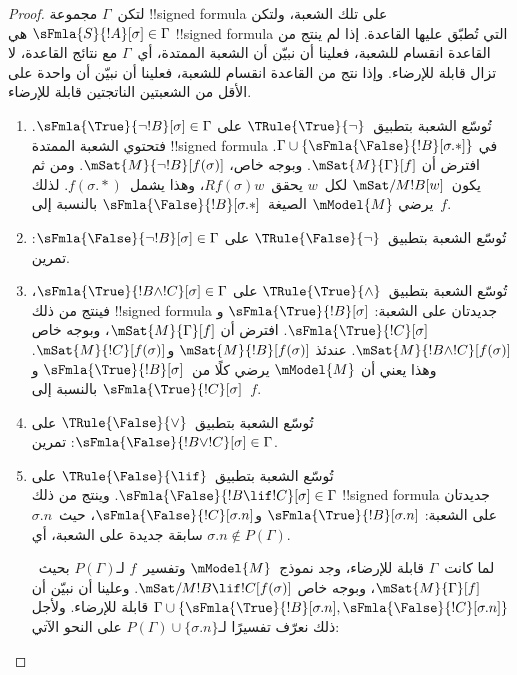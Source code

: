 \documentclass[../../../include/open-logic-section]{subfiles}
\begin{document}
\begin{proof}
لتكن~$\Gamma$ مجموعة !!{signed formula} على تلك الشعبة، ولتكن
$\sFmla{S}{!A}[\sigma] \in \Gamma$ هي !!{signed formula} التي تُطبّق
عليها القاعدة. إذا لم ينتج من القاعدة انقسام للشعبة، فعلينا أن نبيّن أن
الشعبة الممتدة، أي~$\Gamma$ مع نتائج القاعدة، لا تزال قابلة للإرضاء.
وإذا نتج من القاعدة انقسام للشعبة، فعلينا أن نبيّن أن واحدة على الأقل
من الشعبتين الناتجتين قابلة للإرضاء.
\begin{enumerate}
\item تُوسّع الشعبة بتطبيق~$\TRule{\True}{\lnot}$ على
  $\sFmla{\True}{\lnot !B}[\sigma] \in \Gamma$. فتحتوي الشعبة الممتدة
  !!{signed formula} في
  $\Gamma \cup \{\sFmla{\False}{!B}[\sigma.{*}]\}$. افترض أن
  $\mSat{M}{\Gamma}[f]$. وبوجه خاص،
  $\mSat{M}{\lnot !B}[f(\sigma)]$. ومن ثم يكون~$\mSat/{M}{!B}[w]$
  لكل~$w$ يحقق~$Rf(\sigma)w$، وهذا يشمل~$f(\sigma.{*})$. لذلك يرضي
  $\mModel{M}$ الصيغة~$\sFmla{\False}{!B}[\sigma.{*}]$ بالنسبة إلى~$f$.
\item تُوسّع الشعبة بتطبيق~$\TRule{\False}{\lnot}$ على
  $\sFmla{\False}{\lnot !B}[\sigma] \in \Gamma$: تمرين.
\item تُوسّع الشعبة بتطبيق~$\TRule{\True}{\land}$ على
  $\sFmla{\True}{!B \land !C}[\sigma] \in \Gamma$، فينتج من ذلك
  !!{signed formula} جديدتان على الشعبة:
  $\sFmla{\True}{!B}[\sigma]$ و$\sFmla{\True}{!C}[\sigma]$. افترض أن
  $\mSat{M}{\Gamma}[f]$، وبوجه خاص
  $\mSat{M}{!B \land !C}[f(\sigma)]$. عندئذ
  $\mSat{M}{!B}[f(\sigma)]$ و$\mSat{M}{!C}[f(\sigma)]$. وهذا يعني أن
  $\mModel{M}$ يرضي كلًا من~$\sFmla{\True}{!B}[\sigma]$
  و$\sFmla{\True}{!C}[\sigma]$ بالنسبة إلى~$f$.
\item تُوسّع الشعبة بتطبيق~$\TRule{\False}{\lor}$ على
  $\sFmla{\False}{!B \lor !C}[\sigma] \in \Gamma$: تمرين.
\item تُوسّع الشعبة بتطبيق~$\TRule{\False}{\lif}$ على
  $\sFmla{\False}{!B \lif !C}[\sigma] \in \Gamma$. وينتج من ذلك
  !!{signed formula} جديدتان على الشعبة:
  $\sFmla{\True}{!B}[\sigma.n]$ و$\sFmla{\False}{!C}[\sigma.n]$،
  حيث~$\sigma.n$ سابقة جديدة على الشعبة، أي
  $\sigma.n \notin P(\Gamma)$.

  لما كانت~$\Gamma$ قابلة للإرضاء، وجد نموذج~$\mModel{M}$ وتفسير~$f$
  لـ$P(\Gamma)$ بحيث~$\mSat{M}{\Gamma}[f]$، وبوجه خاص
  $\mSat/{M}{!B \lif !C}[f(\sigma)]$. وعلينا أن نبيّن أن
  $\Gamma \cup \{\sFmla{\True}{!B}[\sigma.n],
  \sFmla{\False}{!C}[\sigma.n]\}$ قابلة للإرضاء. ولأجل ذلك نعرّف
  تفسيرًا لـ$P(\Gamma) \cup \{\sigma.n\}$ على النحو الآتي:


\end{enumerate}
\end{proof}
\end{document}
